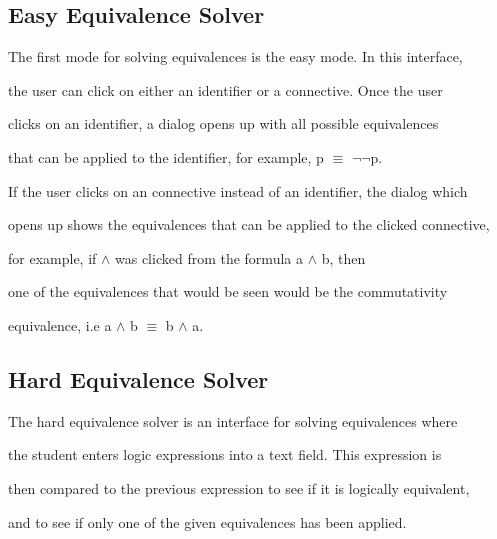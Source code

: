 \documentclass{report}
\begin{document}
\subsection{Easy Equivalence Solver}



The first mode for solving equivalences is the easy mode. In this interface,

the user can click on either an identifier or a connective. Once the user

clicks on an identifier, a dialog opens up with all possible equivalences

that can be applied to the identifier, for example, p $\equiv$ $\neg$$\neg$p.

If the user clicks on an connective instead of an identifier, the dialog which

opens up shows the equivalences that can be applied to the clicked connective,

for example, if $\land$ was clicked from the formula a $\land$ b, then

one of the equivalences that would be seen would be the commutativity

equivalence, i.e a $\land$ b $\equiv$ b $\land$ a.






\subsection{Hard Equivalence Solver}





The hard equivalence solver is an interface for solving equivalences where

the student enters logic expressions into a text field. This expression is

then compared to the previous expression to see if it is logically equivalent,

and to see if only one of the given equivalences has been applied. 










\end{document}

